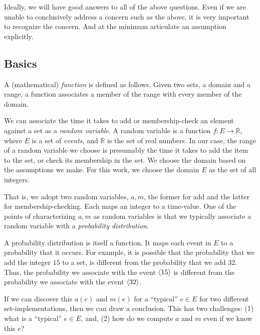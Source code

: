 Ideally, we will have good answers to all of the above questions.
Even if we are unable to conclusively address a concern such
as the above, it is very important to recognize the concern. And
at the minimum articulate an assumption explicitly.

\subsection*{Basics} \label{sec:statistics:basics}
A (mathematical) \emph{function} is defined as follows. Given two sets,
a domain and a range, a function associates a member of the
range with every member of the domain.

We can associate the time it takes to add or membership-check
an element against a set as a \emph{random variable}.
A random variable is a function
$f\!\! : E \longrightarrow \mathbb{R}$, where $E$ is a set
of \emph{events}, and $\mathbb{R}$ is the set of 
real numbers. In our case, the range of a random variable
we choose is presumably the time it takes to add
the item to the set, or check its membership in the set.
We choose the domain based on the assumptions we make.
For this work, we choose the domain $E$ as the set
of all integers.

That is, we adopt two random variables, $a, m$, the former
for add and the latter for membership-checking. Each maps
an integer to a time-value. One of the points of characterizing
$a, m$ as random variables is that
we typically associate
a random variable with a \emph{probability distribution}.

A probability distribution is itself a function. It maps
each event in $E$ to a probability that it occurs.
For example, it is possible that the
probability that we add the integer $15$ to a set,
is different from the probability that we add $32$.
Thus, the probability we associate with the event
$\left\langle 15 \right\rangle$ is different from the probability
we associate with the event $\left\langle 32 \right\rangle$.

If we can discover this $a(e)$ and $m(e)$
for a ``typical'' $e \in E$ for
two different set-implementations, then we can draw a conclusion.
This has two challenges: (1) what is a ``typical'' $e \in E$, and,
(2) how do we compute $a$ and $m$ even if we know this $e$?

